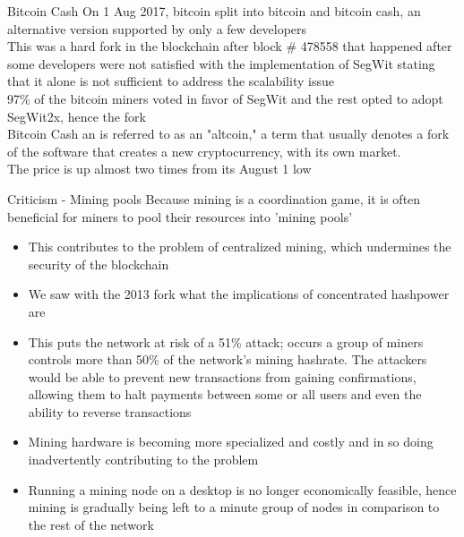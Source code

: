 \documentclass[9pt]{beamer}
\begin{document}

\begin{frame}{Bitcoin Cash}
	On 1 Aug 2017, bitcoin split into bitcoin and bitcoin cash, an alternative version supported by only a few developers \\ \vspace{3mm}
	This was a hard fork in the blockchain after block \# 478558 that happened after some developers were not satisfied with the implementation of SegWit stating that it alone is not sufficient to address the scalability issue \\ \vspace{3mm}
	97\% of the bitcoin miners voted in favor of SegWit and the rest opted to adopt SegWit2x, hence the fork\\ \vspace{3mm}
	Bitcoin Cash an is referred to as an  "altcoin," a term that usually denotes a fork of the software that creates a new cryptocurrency, with its own market. \\ \vspace{3mm}
	The price is up almost two times from its August 1 low
\end{frame}



\begin{frame}{Criticism - Mining pools}
	Because mining is a coordination game, it is often beneficial for miners to pool their resources into 'mining pools'
	\begin{itemize}
		\item This contributes to the problem of centralized mining, which undermines the security of the blockchain
		\item We saw with the 2013 fork what the implications of concentrated hashpower are
		\item This puts the network at risk of a 51\% attack; occurs a group of miners controls more than 50\% of the network's mining hashrate. The attackers would be able to prevent new transactions from gaining confirmations, allowing them to halt payments between some or all users and even the ability to reverse transactions
		\item Mining hardware is becoming more specialized and costly and in so doing inadvertently contributing to the problem
		\item Running a mining node on a desktop is no longer economically feasible, hence mining is gradually being left to a minute group of nodes in comparison to the rest of the network
	\end{itemize}
\end{frame}
\end{document}
